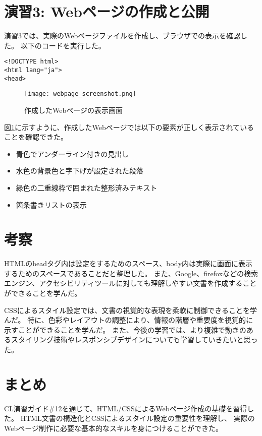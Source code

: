 \documentclass[a4paper,12pt]{jarticle}
\begin{document}
\section{演習3: Webページの作成と公開}
演習3では、実際のWebページファイルを作成し、ブラウザでの表示を確認した。
以下のコードを実行した。
\begin{verbatim}
<!DOCTYPE html>
<html lang="ja">
<head>
\end{verbatim}

\begin{figure}[htbp]
\begin{center}
\texttt{[image: webpage\_screenshot.png]}
\caption{作成したWebページの表示画面}\label{fig1}
\end{center}
\end{figure}

図\ref{fig1}に示すように、作成したWebページでは以下の要素が正しく表示されていることを確認できた。
\begin{itemize}
\item 青色でアンダーライン付きの見出し
\item 水色の背景色と字下げが設定された段落
\item 緑色の二重線枠で囲まれた整形済みテキスト
\item 箇条書きリストの表示
\end{itemize}

\section{考察}
HTMLのheadタグ内は設定をするためのスペース、body内は実際に画面に表示するためのスペースであることだと整理した。
また、Google、firefoxなどの検索エンジン、アクセシビリティツールに対しても理解しやすい文書を作成することができることを学んだ。

CSSによるスタイル設定では、文書の視覚的な表現を柔軟に制御できることを学んだ。
特に、色彩やレイアウトの調整により、情報の階層や重要度を視覚的に示すことができることを学んだ。
また、今後の学習では、より複雑で動きのあるスタイリング技術やレスポンシブデザインについても学習していきたいと思った。

\section{まとめ}
CL演習ガイド\#12を通じて、HTML/CSSによるWebページ作成の基礎を習得した。
HTML文書の構造化とCSSによるスタイル設定の重要性を理解し、
実際のWebページ制作に必要な基本的なスキルを身につけることができた。
\end{document}
